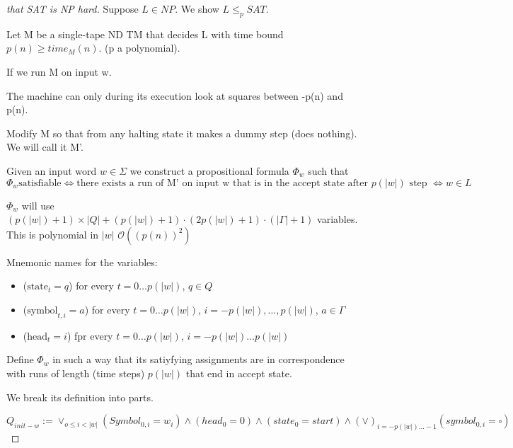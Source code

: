 \documentclass[a4paper,12pt]{article}
\theoremstyle{definition}
\theoremstyle{remark}
\begin{document}
\begin{proof}[that SAT is NP hard]
    Suppose $L \in NP$. We show $L \leq_p SAT$.

    Let M be a single-tape ND TM that decides L with time bound $p(n) \geq time_M(n)$. (p a polynomial).

    If we run M on input w.

    The machine can only during its execution look at squares between -p(n) and p(n).

    Modify M so that from any halting state it makes a dummy step (does nothing). We will call it M'.

    Given an input word $w \in \Sigma$ we construct a propositional formula $\Phi_w$ such that
    \begin{equation*}
        \Phi_w  \text{satisfiable} \iff \text{there exists a run of M' on input w that is in the accept state after } p(|w|) \text{ step }
         \iff w \in L
    \end{equation*}

    $\Phi_w$ will use $(p(|w|) + 1) \times |Q| + (p(|w|) + 1) \cdot (2p(|w|) +1) \cdot (|\Gamma| + 1)$ variables. This
    is polynomial in $|w|$ $\mathscr{O}((p(n))^2)$

    Mnemonic names for the variables:
    \begin{itemize}
        \item ($\text{state}_t = q$) for every $t = 0 \dots p(|w|)$, $q \in Q$
        \item ($\text{symbol}_{t, i} = a$) for every $t = 0 \dots p(|w|)$, $i = -p(|w|), \dots, p(|w|)$, $a \in \Gamma$
        \item ($\text{head}_t = i$) fpr every $t = 0 \dots p(|w|)$, $i = -p(|w|) \dots p(|w|)$ 
    \end{itemize}

    Define $\Phi_w$ in such a way that its satiyfying assignments are in correspondence with runs of length
    (time steps) $p(|w|)$ that end in accept state.

    We break its definition into parts.

    \begin{equation*}
        Q_{init-w} := \vee_{o \leq i < |w|} (Symbol_{0, i} = w_i) \land (head_0 = 0) \land
         (state_0 = start) \land (\vee)_{i = -p(|w|) \dots -1} (symbol_{0, i} = \square)
    \end{equation*}
\end{proof}
\end{document}
